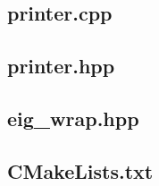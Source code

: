 \documentclass[a4paper, 12pt]{article}
\begin{document}
\subsection{printer.cpp} \label{subsec:printer.cpp}

\subsection{printer.hpp} \label{subsec:printer.hpp}


\subsection{eig\_wrap.hpp} \label{subsec:eig_wrap.hpp}


\subsection{CMakeLists.txt} \label{subsec:CMakeLists.txt}

\end{document}
